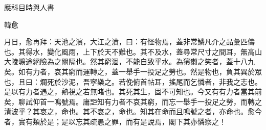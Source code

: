 應科目時與人書

韓愈

月日，愈再拜：天池之濱，大江之濆，曰：有怪物焉，蓋非常鱗凡介之品彙匹儔也。其得水，變化風雨，上下於天不難也。其不及水，蓋尋常尺寸之間耳，無高山大陵曠途絕險為之關隔也。然其窮涸，不能自致乎水。為獱獺之笑者，蓋十八九矣。如有力者，哀其窮而運轉之，蓋一舉手一投足之勞也。然是物也，負其異於眾也，且曰：爛死於沙泥，吾寧樂之。若俛俯首帖耳，搖尾而乞憐者，非我之志也。是以有力者遇之，熟視之若無睹也。其死其生，固不可知也。今又有有力者當其前矣，聊試仰首一鳴號焉。庸詎知有力者不哀其窮，而忘一舉手一投足之勞，而轉之清波乎？其哀之，命也。其不哀之，命也。知其在命而且鳴號之者，亦命也。愈今者，實有類於是；是以忘其疏愚之罪，而有是說焉，閣下其亦憐察之！